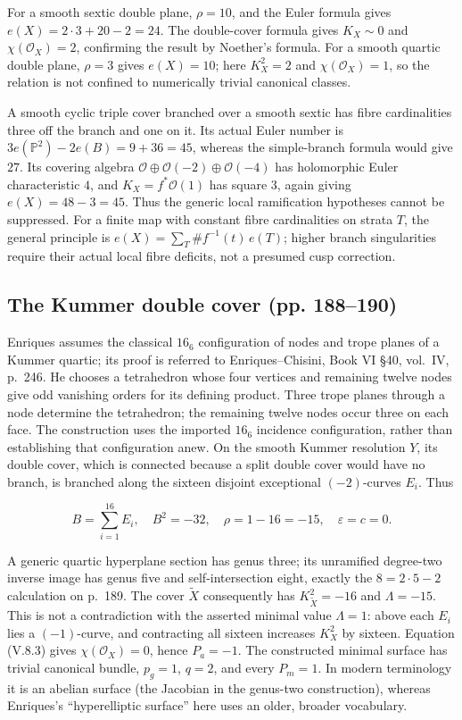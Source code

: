 \begin{example}
For a smooth sextic double plane, $\rho=10$, and the Euler formula gives
$e(X)=2\cdot3+20-2=24$. The double-cover formula gives
$K_X\sim0$ and $\chi(\mathcal O_X)=2$, confirming the result by Noether's
formula. For a smooth quartic double plane, $\rho=3$ gives $e(X)=10$;
here $K_X^2=2$ and $\chi(\mathcal O_X)=1$, so the relation is not confined
to numerically trivial canonical classes.

A smooth cyclic triple cover branched over a smooth sextic has fibre
cardinalities three off the branch and one on it. Its actual Euler number is
$3e(\mathbb P^2)-2e(B)=9+36=45$, whereas the simple-branch formula would
give $27$. Its covering algebra
$\mathcal O\oplus\mathcal O(-2)\oplus\mathcal O(-4)$ has holomorphic
Euler characteristic $4$, and $K_X=f^*\mathcal O(1)$ has square $3$,
again giving $e(X)=48-3=45$. Thus the generic local ramification hypotheses
cannot be suppressed. For a finite map with constant fibre cardinalities on
strata $T$, the general principle is
$e(X)=\sum_T\#f^{-1}(t)\,e(T)$; higher branch singularities require their
actual local fibre deficits, not a presumed cusp correction.
\end{example}

\subsection{The Kummer double cover (pp. 188--190)}

Enriques assumes the classical \(16_6\) configuration of nodes and trope planes of a Kummer quartic; its proof is referred to Enriques--Chisini, Book VI §40, vol.~IV, p.~246. He chooses a tetrahedron whose four vertices and remaining twelve nodes give odd vanishing orders for its defining product. Three trope planes through a node determine the tetrahedron; the remaining twelve nodes occur three on each face. The construction uses the imported \(16_6\) incidence configuration, rather than establishing that configuration anew. On the smooth Kummer resolution \(Y\), its double cover, which is connected because a split double cover would have no branch, is branched along the sixteen disjoint exceptional \((-2)\)-curves \(E_i\). Thus

\[
B=\sum_{i=1}^{16}E_i,\quad B^2=-32,\quad
\rho=1-16=-15,\quad \varepsilon=c=0.
\]

A generic quartic hyperplane section has genus three; its unramified degree-two inverse image has genus five and self-intersection eight, exactly the \(8=2\cdot5-2\) calculation on p.~189. The cover \(\widetilde X\) consequently has \(K_{\widetilde X}^2=-16\) and \(\Lambda=-15\). This is not a contradiction with the asserted minimal value \(\Lambda=1\): above each \(E_i\) lies a \((-1)\)-curve, and contracting all sixteen increases \(K_X^2\) by sixteen. Equation (V.8.3) gives \(\chi(\mathcal O_X)=0\), hence \(P_a=-1\). The constructed minimal surface has trivial canonical bundle, \(p_g=1\), \(q=2\), and every \(P_m=1\). In modern terminology it is an abelian surface (the Jacobian in the genus-two construction), whereas Enriques's ``hyperelliptic surface'' here uses an older, broader vocabulary.

